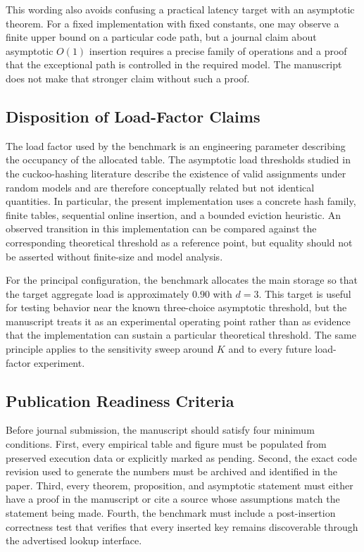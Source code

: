 \documentclass[conference]{IEEEtran}
\begin{document}
This wording also avoids confusing a practical latency target with an asymptotic theorem. For a fixed implementation with fixed constants, one may observe a finite upper bound on a particular code path, but a journal claim about asymptotic $O(1)$ insertion requires a precise family of operations and a proof that the exceptional path is controlled in the required model. The manuscript does not make that stronger claim without such a proof.

\subsection{Disposition of Load-Factor Claims}

The load factor used by the benchmark is an engineering parameter describing the occupancy of the allocated table. The asymptotic load thresholds studied in the cuckoo-hashing literature describe the existence of valid assignments under random models and are therefore conceptually related but not identical quantities. In particular, the present implementation uses a concrete hash family, finite tables, sequential online insertion, and a bounded eviction heuristic. An observed transition in this implementation can be compared against the corresponding theoretical threshold as a reference point, but equality should not be asserted without finite-size and model analysis.

For the principal configuration, the benchmark allocates the main storage so that the target aggregate load is approximately $0.90$ with $d=3$. This target is useful for testing behavior near the known three-choice asymptotic threshold, but the manuscript treats it as an experimental operating point rather than as evidence that the implementation can sustain a particular theoretical threshold. The same principle applies to the sensitivity sweep around $K$ and to every future load-factor experiment.

\subsection{Publication Readiness Criteria}

Before journal submission, the manuscript should satisfy four minimum conditions. First, every empirical table and figure must be populated from preserved execution data or explicitly marked as pending. Second, the exact code revision used to generate the numbers must be archived and identified in the paper. Third, every theorem, proposition, and asymptotic statement must either have a proof in the manuscript or cite a source whose assumptions match the statement being made. Fourth, the benchmark must include a post-insertion correctness test that verifies that every inserted key remains discoverable through the advertised lookup interface.
\end{document}
